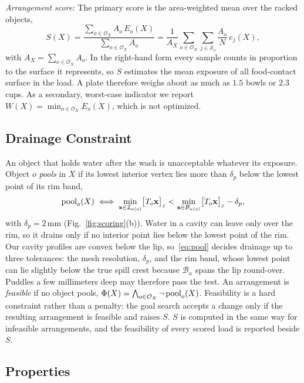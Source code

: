 \textit{Arrangement score:}
The primary score is the area-weighted mean over the racked objects,
\begin{equation}
S(X)=\frac{\sum_{o\in\mathcal{O}_X}A_o\,E_o(X)}{\sum_{o\in\mathcal{O}_X}A_o}
=\frac{1}{A_X}\sum_{o\in\mathcal{O}_X}\sum_{j\in\mathcal{S}_o}\frac{A_o}{N}\,e_j(X),
\label{eq:score}
\end{equation}
with $A_X=\sum_{o\in\mathcal{O}_X}A_o$.
In the right-hand form every sample counts in proportion to the surface it represents, so $S$ estimates the mean exposure of all food-contact surface in the load.
A plate therefore weighs about as much as $1.5$ bowls or $2.3$ cups.
As a secondary, worst-case indicator we report $W(X)=\min_{o\in\mathcal{O}_X}E_o(X)$, which is not optimized.

\subsection{Drainage Constraint}
\label{sec:scoring-pooling}

An object that holds water after the wash is unacceptable whatever its exposure.
Object $o$ \emph{pools} in $X$ if its lowest interior vertex lies more than $\delta_p$ below the lowest point of its rim band,
\begin{equation}
\operatorname{pool}_o(X)\iff\min_{\mathbf{x}\in\mathcal{I}_{\kappa(o)}}\bigl[T_o\mathbf{x}\bigr]_z<\min_{\mathbf{x}\in\mathcal{B}_{\kappa(o)}}\bigl[T_o\mathbf{x}\bigr]_z-\delta_p,
\label{eq:pool}
\end{equation}
with $\delta_p=2$\,mm (Fig.~\ref{fig:scoring}(b)).
Water in a cavity can leave only over the rim, so it drains only if no interior point lies below the lowest point of the rim.
Our cavity profiles are convex below the lip, so~\eqref{eq:pool} decides drainage up to three tolerances: the mesh resolution, $\delta_p$, and the rim band, whose lowest point can lie slightly below the true spill crest because $\mathcal{B}_\kappa$ spans the lip round-over.
Puddles a few millimeters deep may therefore pass the test.
An arrangement is \emph{feasible} if no object pools, $\Phi(X)=\bigwedge_{o\in\mathcal{O}_X}\neg\operatorname{pool}_o(X)$.
Feasibility is a hard constraint rather than a penalty: the goal search accepts a change only if the resulting arrangement is feasible and raises $S$.
$S$ is computed in the same way for infeasible arrangements, and the feasibility of every scored load is reported beside $S$.

\subsection{Properties}
\label{sec:scoring-properties}

